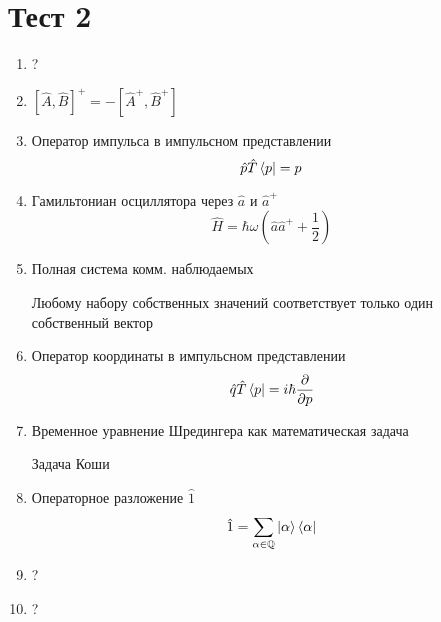 \section*{Тест 2}
\begin{enumerate}
    \item ?
    \item $[\hat A,\hat B]^+=-[\hat A^+,\hat B^+]$
    \item Оператор импульса в импульсном представлении
        $$\hat p \hat T\bra{p}=p$$
    \item Гамильтониан осциллятора через $\hat a$ и $\hat a^+$
        $$\hat H=\hbar\omega(\hat a\hat a^++\frac{1}{2})$$
    \item Полная система комм. наблюдаемых

        Любому набору собственных значений соответствует только один 
        собственный вектор
    \item Оператор координаты в импульсном представлении
        $$\hat q\hat T\bra{p}=i\hbar\frac{\partial}{\partial p}$$
    \item Временное уравнение Шредингера как математическая задача

        Задача Коши
    \item Операторное разложение $\hat 1$
        $$\hat 1=\sum_{\alpha\in\mathbb Q}\ket{\alpha}\bra{\alpha}$$
    \item ?
    \item ?
\end{enumerate}
